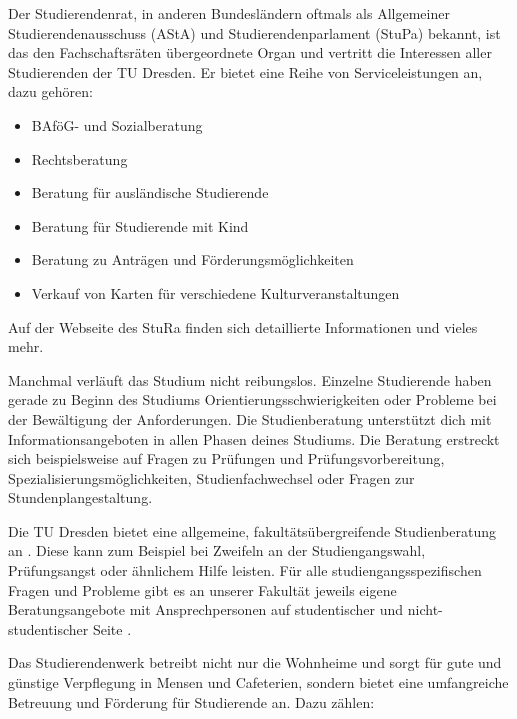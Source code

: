 Der Studierendenrat, in anderen Bundesländern oftmals als Allgemeiner Studierendenausschuss (AStA) und Studierendenparlament (StuPa) bekannt, ist das den Fachschaftsräten übergeordnete Organ und vertritt die Interessen aller Studierenden der TU Dresden. Er bietet eine Reihe von Serviceleistungen an, dazu gehören:
\begin{itemize}
\item BAföG- und Sozialberatung
\item Rechtsberatung
\item Beratung für ausländische Studierende
\item Beratung für Studierende mit Kind
\item Beratung zu Anträgen und Förderungsmöglichkeiten
\item Verkauf von Karten für verschiedene Kulturveranstaltungen
\end{itemize}

Auf der Webseite des StuRa  finden sich detaillierte Informationen und vieles mehr.


\pagebreak

Manchmal verläuft das Studium nicht reibungslos.
Einzelne Studierende haben gerade zu Beginn des Studiums Orientierungsschwierigkeiten oder Probleme bei der Bewältigung der Anforderungen.
Die Studienberatung unterstützt dich mit Informationsangeboten in allen Phasen deines Studiums.
Die Beratung erstreckt sich beispielsweise auf Fragen zu Prüfungen und Prüfungsvorbereitung, Spezialisierungsmöglichkeiten, Studienfachwechsel oder Fragen zur Stundenplangestaltung.

Die TU Dresden bietet eine allgemeine, fakultätsübergreifende Studienberatung an . Diese kann zum Beispiel bei Zweifeln an der Studiengangswahl, Prüfungsangst oder ähnlichem Hilfe leisten. Für alle studiengangsspezifischen Fragen und Probleme gibt es an unserer Fakultät jeweils eigene Beratungsangebote mit Ansprechpersonen auf studentischer und nicht-studentischer Seite .

Das Studierendenwerk betreibt nicht nur die Wohnheime und sorgt für gute und günstige Verpflegung in Mensen und Cafeterien, sondern bietet eine umfangreiche Betreuung und Förderung für Studierende an. Dazu zählen:

